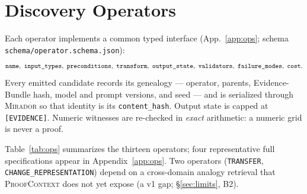 \documentclass[11pt]{amsart}
\theoremstyle{definition}
\theoremstyle{remark}
\newcommand{\mirador}{\textsc{Mirador}}
\newcommand{\pc}{\textsc{ProofContext}}
\newcommand{\state}[1]{\texttt{[#1]}}
\newcommand{\op}[1]{\texttt{#1}}
\begin{document}
\section{Discovery Operators}\label{sec:operators}

Each operator implements a common typed interface (App.~\ref{app:ops};
schema \texttt{schema/operator.schema.json}):
\[
\text{\op{name}},\ \text{\op{input\_types}},\ \text{\op{preconditions}},\
\text{\op{transform}},\ \text{\op{output\_state}},\ \text{\op{validators}},\
\text{\op{failure\_modes}},\ \text{\op{cost}}.
\]
Every emitted candidate records its genealogy --- operator, parents,
Evidence-Bundle hash, model and prompt versions, and seed --- and is serialized
through \mirador{} so that identity is its \texttt{content\_hash}. Output state
is capped at \state{EVIDENCE}. Numeric witnesses are re-checked in \emph{exact}
arithmetic: a numeric grid is never a proof.

Table~\ref{tab:ops} summarizes the thirteen operators; four representative full
specifications appear in Appendix~\ref{app:ops}. Two operators
(\op{TRANSFER}, \op{CHANGE\_REPRESENTATION}) depend on a cross-domain analogy
retrieval that \pc{} does not yet expose (a v1 gap; \S\ref{sec:limits}, B2).
\end{document}
